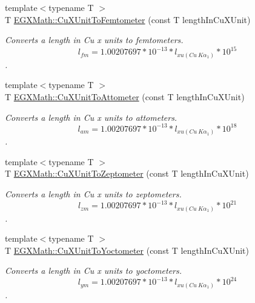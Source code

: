 \begin{DoxyCompactItemize}
{\footnotesize template$<$typename T $>$ }\\T \mbox{\hyperlink{group___e_g_x_math-_conversions-_length_conversions-_non-_s_i-_cu_x_unit-_s_i_ga421b3a85685a8e55cc82e2b268388fca}{E\+G\+X\+Math\+::\+Cu\+X\+Unit\+To\+Femtometer}} (const T length\+In\+Cu\+X\+Unit)
\begin{DoxyCompactList}\small\item\em Converts a length in Cu x units to femtometers. \[ l_{fm}=1.00207697*10^{-13} * l_{xu(Cu\ K\alpha_1)} * 10^{15} \]. \end{DoxyCompactList}\item 
{\footnotesize template$<$typename T $>$ }\\T \mbox{\hyperlink{group___e_g_x_math-_conversions-_length_conversions-_non-_s_i-_cu_x_unit-_s_i_gac5f865a6c60f1712b7f7cfb29d52407b}{E\+G\+X\+Math\+::\+Cu\+X\+Unit\+To\+Attometer}} (const T length\+In\+Cu\+X\+Unit)
\begin{DoxyCompactList}\small\item\em Converts a length in Cu x units to attometers. \[ l_{am}=1.00207697*10^{-13} * l_{xu(Cu\ K\alpha_1)} * 10^{18} \]. \end{DoxyCompactList}\item 
{\footnotesize template$<$typename T $>$ }\\T \mbox{\hyperlink{group___e_g_x_math-_conversions-_length_conversions-_non-_s_i-_cu_x_unit-_s_i_gaa35b226ca82bd0d4389aaae81e5b385e}{E\+G\+X\+Math\+::\+Cu\+X\+Unit\+To\+Zeptometer}} (const T length\+In\+Cu\+X\+Unit)
\begin{DoxyCompactList}\small\item\em Converts a length in Cu x units to zeptometers. \[ l_{zm}=1.00207697*10^{-13} * l_{xu(Cu\ K\alpha_1)} * 10^{21} \]. \end{DoxyCompactList}\item 
{\footnotesize template$<$typename T $>$ }\\T \mbox{\hyperlink{group___e_g_x_math-_conversions-_length_conversions-_non-_s_i-_cu_x_unit-_s_i_ga1ca2e50ece8bd507137c3ce1bec24570}{E\+G\+X\+Math\+::\+Cu\+X\+Unit\+To\+Yoctometer}} (const T length\+In\+Cu\+X\+Unit)
\begin{DoxyCompactList}\small\item\em Converts a length in Cu x units to yoctometers. \[ l_{ym}=1.00207697*10^{-13} * l_{xu(Cu\ K\alpha_1)} * 10^{24} \]. \end{DoxyCompactList}\end{DoxyCompactItemize}


